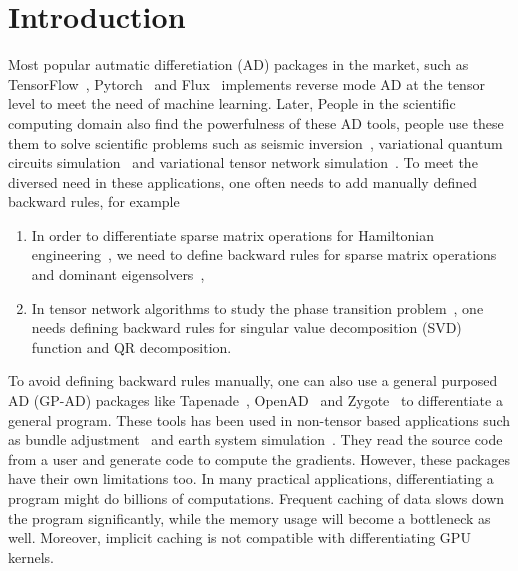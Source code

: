 \documentclass{article}
\newcommand{\<}{\langle}
\renewcommand{\>}{\rangle}
\theoremstyle{definition}\newtheorem{definition}{\textit{Definition}}
\begin{document}
\section{Introduction}\label{sec:intro}
    Most popular autmatic differetiation (AD) packages in the market, such as TensorFlow~\cite{Tensorflow2015}, Pytorch~\cite{Paszke2017} and Flux~\cite{Innes2018a} implements reverse mode AD at the tensor level to meet the need of machine learning. Later, People in the scientific computing domain also find the powerfulness of these AD tools, people use these them to solve scientific problems such as seismic inversion~\cite{Zhu2020}, variational quantum circuits simulation~\cite{Bergholm2018} and variational tensor network simulation~\cite{Liao2019,Roberts2019}. To meet the diversed need in these applications, one often needs to add manually defined backward rules, for example
    \begin{enumerate}
        \item In order to differentiate sparse matrix operations for Hamiltonian engineering~\cite{Xie2020}, we need to define backward rules for sparse matrix operations and dominant eigensolvers~\cite{Golub2012},
        \item In tensor network algorithms to study the phase transition problem~\cite{Golub2012,Liao2019,Seeger2017,Wan2019,Hubig2019}, one needs defining backward rules for singular value decomposition (SVD) function and QR decomposition.
    \end{enumerate}
    To avoid defining backward rules manually, one can also use a general purposed AD (GP-AD) packages like Tapenade~\cite{Hascoet2013}, OpenAD~\cite{Utke2008} and Zygote~\cite{Innes2018, Innes2019} to differentiate a general program. These tools has been used in non-tensor based applications such as bundle adjustment~\cite{Shen2018} and earth system simulation~\cite{Forget2015}.
They read the source code from a user and generate code to compute the gradients. However, these packages have their own limitations too. In many practical applications, differentiating a program might do billions of computations. Frequent caching of data slows down the program significantly, while the memory usage will become a bottleneck as well. Moreover, implicit caching is not compatible with differentiating GPU kernels.
\end{document}
